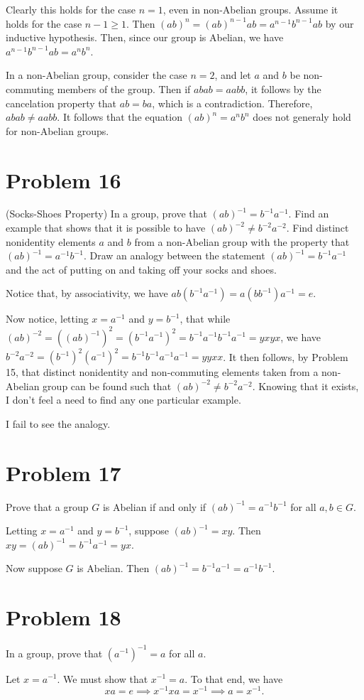 \documentclass[12pt]{article}
\begin{document}
Clearly this holds for the case $n=1$, even in non-Abelian groups.
Assume it holds for the case $n-1\geq 1$.  Then $(ab)^n=(ab)^{n-1}ab = a^{n-1}b^{n-1}ab$
by our inductive hypothesis.  Then, since our group is Abelian, we have $a^{n-1}b^{n-1}ab=a^nb^n$.

In a non-Abelian group, consider the case $n=2$, and let $a$ and $b$ be non-commuting members of the group.
Then if $abab=aabb$, it follows by the cancelation property that $ab=ba$, which is a contradiction.
Therefore, $abab\neq aabb$.  It follows that the equation $(ab)^n= a^nb^n$ does not generaly hold for non-Abelian groups.

\section*{Problem 16}

(Socks-Shoes Property)  In a group, prove that $(ab)^{-1}=b^{-1}a^{-1}$.  Find
an example that shows that it is possible to have $(ab)^{-2}\neq b^{-2}a^{-2}$.  Find
distinct nonidentity elements $a$ and $b$ from a non-Abelian group with the
property that $(ab)^{-1}=a^{-1}b^{-1}$.  Draw an analogy between the statement $(ab)^{-1}=b^{-1}a^{-1}$
and the act of putting on and taking off your socks and shoes.

Notice that, by associativity, we have $ab(b^{-1}a^{-1}) = a(bb^{-1})a^{-1}=e$.

Now notice, letting $x=a^{-1}$ and $y=b^{-1}$, that while $(ab)^{-2}=((ab)^{-1})^2=(b^{-1}a^{-1})^2=b^{-1}a^{-1}b^{-1}a^{-1}=yxyx$,
we have $b^{-2}a^{-2}=(b^{-1})^2(a^{-1})^2=b^{-1}b^{-1}a^{-1}a^{-1}=yyxx$.
It then follows, by Problem 15, that distinct nonidentity and non-commuting elements taken from a
non-Abelian group can be found such that $(ab)^{-2}\neq b^{-2}a^{-2}$.  Knowing that it exists,
I don't feel a need to find any one particular example.

I fail to see the analogy.

\section*{Problem 17}

Prove that a group $G$ is Abelian if and only if $(ab)^{-1}=a^{-1}b^{-1}$ for all $a,b\in G$.

Letting $x=a^{-1}$ and $y=b^{-1}$,
suppose $(ab)^{-1}=xy$.  Then $xy=(ab)^{-1}=b^{-1}a^{-1}=yx$.

Now suppose $G$ is Abelian.  Then $(ab)^{-1}=b^{-1}a^{-1}=a^{-1}b^{-1}$.

\section*{Problem 18}

In a group, prove that $(a^{-1})^{-1}=a$ for all $a$.

Let $x=a^{-1}$.  We must show that $x^{-1}=a$.  To that end, we have
\begin{equation*}
xa=e\implies x^{-1}xa=x^{-1}\implies a=x^{-1}.
\end{equation*}
\end{document}

